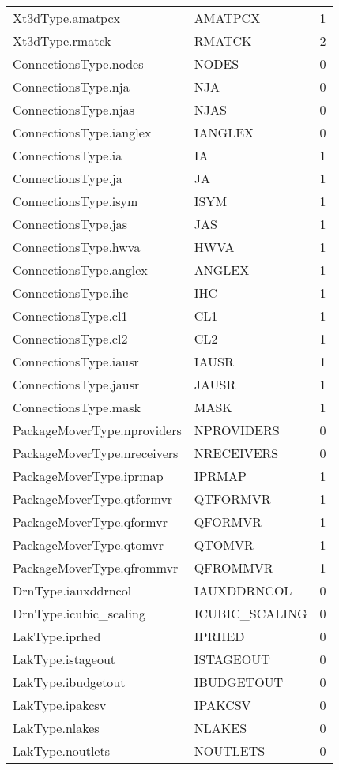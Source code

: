\begin{longtable}{p{6cm} p{4cm} p{2cm} }
Xt3dType.amatpcx &  AMATPCX & 1 \\ 
Xt3dType.rmatck &  RMATCK & 2 \\ 
ConnectionsType.nodes &  NODES & 0 \\ 
ConnectionsType.nja &  NJA & 0 \\ 
ConnectionsType.njas &  NJAS & 0 \\ 
ConnectionsType.ianglex &  IANGLEX & 0 \\ 
ConnectionsType.ia &  IA & 1 \\ 
ConnectionsType.ja &  JA & 1 \\ 
ConnectionsType.isym &  ISYM & 1 \\ 
ConnectionsType.jas &  JAS & 1 \\ 
ConnectionsType.hwva &  HWVA & 1 \\ 
ConnectionsType.anglex &  ANGLEX & 1 \\ 
ConnectionsType.ihc &  IHC & 1 \\ 
ConnectionsType.cl1 &  CL1 & 1 \\ 
ConnectionsType.cl2 &  CL2 & 1 \\ 
ConnectionsType.iausr &  IAUSR & 1 \\ 
ConnectionsType.jausr &  JAUSR & 1 \\ 
ConnectionsType.mask &  MASK & 1 \\ 
PackageMoverType.nproviders &  NPROVIDERS & 0 \\ 
PackageMoverType.nreceivers &  NRECEIVERS & 0 \\ 
PackageMoverType.iprmap &  IPRMAP & 1 \\ 
PackageMoverType.qtformvr &  QTFORMVR & 1 \\ 
PackageMoverType.qformvr &  QFORMVR & 1 \\ 
PackageMoverType.qtomvr &  QTOMVR & 1 \\ 
PackageMoverType.qfrommvr &  QFROMMVR & 1 \\ 
DrnType.iauxddrncol &  IAUXDDRNCOL & 0 \\ 
DrnType.icubic\_scaling &  ICUBIC\_SCALING & 0 \\ 
LakType.iprhed &  IPRHED & 0 \\ 
LakType.istageout &  ISTAGEOUT & 0 \\ 
LakType.ibudgetout &  IBUDGETOUT & 0 \\ 
LakType.ipakcsv &  IPAKCSV & 0 \\ 
LakType.nlakes &  NLAKES & 0 \\ 
LakType.noutlets &  NOUTLETS & 0 \\ 

\end{longtable}
